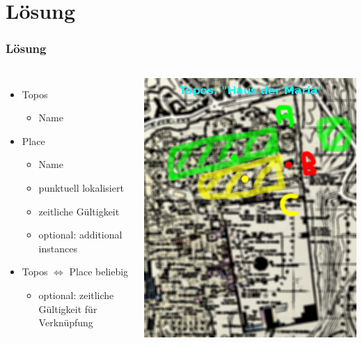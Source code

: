 \documentclass{beamer}
\begin{document}
\section{Lösung} 
\begin{frame}
			\frametitle{Lösung}
			\begin{columns}
			\begin{itemize}
				\item Topos
					\begin{itemize}
						\item Name
					\end{itemize} 
					\item Place
					\begin{itemize}
						\item Name
						\item punktuell lokalisiert
						\item zeitliche Gültigkeit 												
						\item optional: additional instances
					\end{itemize}
					\item Topos $\Leftrightarrow$ Place beliebig
					\begin{itemize}
						\item optional: zeitliche Gültigkeit für Verknüpfung
					\end{itemize}
			\end{itemize}
					\includegraphics[width=\linewidth]{detail_1}
			\end{columns}
	\end{frame}
\end{document}

